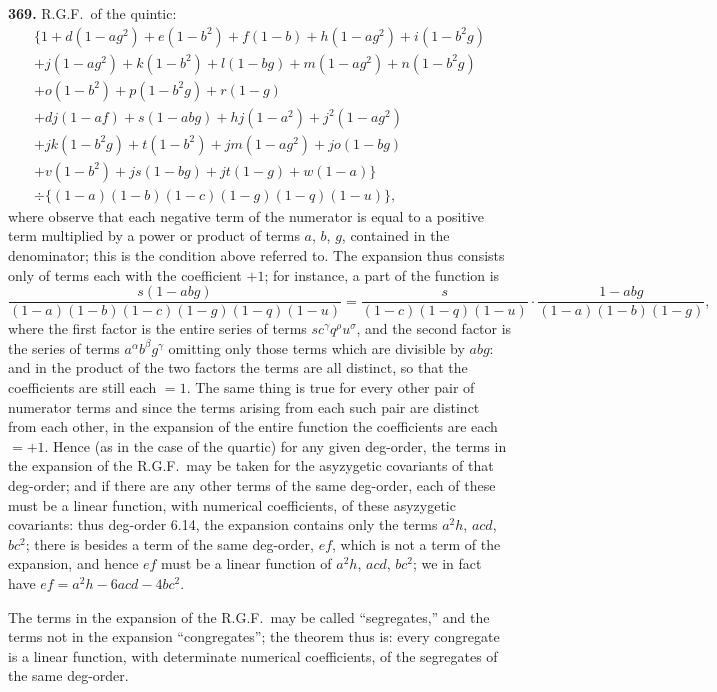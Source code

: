 \documentclass[12pt,a4paper]{article}
\begin{document}
\medskip

\noindent\textbf{369.} R.G.F.\ of the quintic:
\begin{multline*}
\{1 + d(1-ag^2) + e(1-b^2) + f(1-b) + h(1-ag^2) + i(1-b^2g)\\
+ j(1-ag^2) + k(1-b^2) + l(1-bg) + m(1-ag^2) + n(1-b^2g)\\
+ o(1-b^2) + p(1-b^2g) + r(1-g)\\
+ dj(1-af) + s(1-abg) + hj(1-a^2) + j^2(1-ag^2)\\
+ jk(1-b^2g) + t(1-b^2) + jm(1-ag^2) + jo(1-bg)\\
+ v(1-b^2) + js(1-bg) + jt(1-g) + w(1-a)\}\\
\div \{(1-a)(1-b)(1-c)(1-g)(1-q)(1-u)\},
\end{multline*}
where observe that each negative term of the numerator is equal to a positive term multiplied by a power or product of terms $a$, $b$, $g$, contained in the denominator; this is the condition above referred to. The expansion thus consists only of terms each with the coefficient $+1$; for instance, a part of the function is
\[
\frac{s(1-abg)}{(1-a)(1-b)(1-c)(1-g)(1-q)(1-u)} = \frac{s}{(1-c)(1-q)(1-u)} \cdot \frac{1-abg}{(1-a)(1-b)(1-g)},
\]
where the first factor is the entire series of terms $s c^\gamma q^\rho u^\sigma$, and the second factor is the series of terms $a^\alpha b^\beta g^\gamma$ omitting only those terms which are divisible by $abg$: and in the product of the two factors the terms are all distinct, so that the coefficients are still each $=1$. The same thing is true for every other pair of numerator terms and since the terms arising from each such pair are distinct from each other, in the expansion of the entire function the coefficients are each $=+1$. Hence (as in the case of the quartic) for any given deg-order, the terms in the expansion of the R.G.F.\ may be taken for the asyzygetic covariants of that deg-order; and if there are any other terms of the same deg-order, each of these must be a linear function, with numerical coefficients, of these asyzygetic covariants: thus deg-order 6.14, the expansion contains only the terms $a^2 h$, $acd$, $bc^2$; there is besides a term of the same deg-order, $ef$, which is not a term of the expansion, and hence $ef$ must be a linear function of $a^2 h$, $acd$, $bc^2$; we in fact have $ef = a^2 h - 6acd - 4bc^2$.

The terms in the expansion of the R.G.F.\ may be called ``segregates,'' and the terms not in the expansion ``congregates''; the theorem thus is: every congregate is a linear function, with determinate numerical coefficients, of the segregates of the same deg-order.
\end{document}
